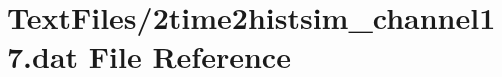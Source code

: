 \hypertarget{2time2histsim__channel17_8dat}{}\section{Text\+Files/2time2histsim\+\_\+channel17.dat File Reference}
\label{2time2histsim__channel17_8dat}
